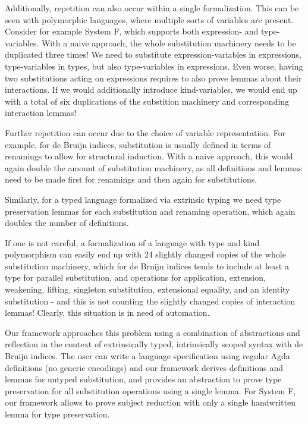 \documentclass[sigplan,10pt, anonymous]{acmart}
\begin{document}
  Additionally, repetition can also occur within a single formalization.
  This can be seen with polymorphic languages, where multiple sorts
  of variables are present.
  Consider for example System F, which supports both expression- and
  type-variables.
  With a naive approach, the whole substitution machinery needs to be
  duplicated three times! We need to substitute expression-variables in
  expressions, type-variables in types, but also type-variables in
  expressions.
  Even worse, having two substitutions acting on expressions requires
  to also prove lemmas about their interactions.
  If we would additionally introduce kind-variables, we would end up
  with a total of six duplications of the substition machinery and
  corresponding interaction lemmas!
  
  Further repetition can occur due to the choice of variable
  representation. For example, for de Bruijn indices, substitution is
  usually defined in terms of renamings to allow for structural
  induction.
  With a naive approach, this would again double the amount of
  substitution machinery, as all definitions and lemmas need to be
  made first for renamings and then again for substitutions.

  Similarly, for a typed language formalized via extrinsic typing we
  need type preservation lemmas for each substitution and renaming
  operation, which again doubles the number of definitions.

  If one is not careful, a formalization of a language with type and
  kind polymorphism can easily end up with 24 slightly changed copies of
  the whole substitution machinery, which for de Bruijn indices tends to
  include at least a type for parallel substitution, and operations for
  application, extension, weakening, lifting, singleton substitution,
  extensional equality, and an identity substitution - and this is not
  counting the slightly changed copies of interaction lemmas!
  Clearly, this situation is in need of automation.

  Our framework approaches this problem using a combination of
  abstractions and reflection in the context of extrinsically typed,
  intrinsically scoped syntax with de Bruijn indices.
  The user can write a language specification using regular Agda
  definitions (no generic encodings) and our framework derives
  definitions and lemmas for untyped substitution, and provides an
  abstraction to prove type preservation for all substitution operations
  using a single lemma. For System F, our framework allows to prove
  subject reduction with only a single handwritten lemma for type
  preservation.
\end{document}
